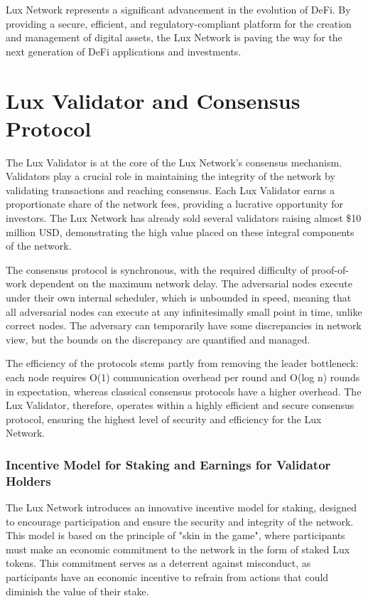 \documentclass[11pt]{article}
\begin{document}
Lux Network represents a significant advancement in the evolution of DeFi. By providing a secure, efficient, and regulatory-compliant platform for the creation and management of digital assets, the Lux Network is paving the way for the next generation of DeFi applications and investments.


\section{Lux Validator and Consensus Protocol}

The Lux Validator is at the core of the Lux Network's consensus mechanism. Validators play a crucial role in maintaining the integrity of the network by validating transactions and reaching consensus. Each Lux Validator earns a proportionate share of the network fees, providing a lucrative opportunity for investors. The Lux Network has already sold several validators raising almost \$10 million USD, demonstrating the high value placed on these integral components of the network.


The consensus protocol is synchronous, with the required difficulty of proof-of-work dependent on the maximum network delay. The adversarial nodes execute under their own internal scheduler, which is unbounded in speed, meaning that all adversarial nodes can execute at any infinitesimally small point in time, unlike correct nodes. The adversary can temporarily have some discrepancies in network view, but the bounds on the discrepancy are quantified and managed.


The efficiency of the protocols stems partly from removing the leader bottleneck: each node requires O(1) communication overhead per round and O(log n) rounds in expectation, whereas classical consensus protocols have a higher overhead. The Lux Validator, therefore, operates within a highly efficient and secure consensus protocol, ensuring the highest level of security and efficiency for the Lux Network.


\subsubsection{Incentive Model for Staking and Earnings for Validator Holders}

The Lux Network introduces an innovative incentive model for staking, designed to encourage participation and ensure the security and integrity of the network. This model is based on the principle of "skin in the game", where participants must make an economic commitment to the network in the form of staked Lux tokens. This commitment serves as a deterrent against misconduct, as participants have an economic incentive to refrain from actions that could diminish the value of their stake.
\end{document}
